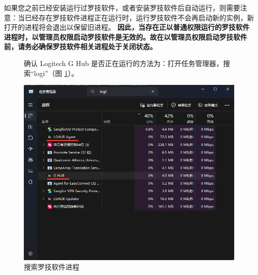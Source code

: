 如果您之前已经安装运行过罗技软件，或者安装罗技软件后自动运行，则需要注意：当已经存在罗技软件进程正在运行时，运行罗技软件不会再启动新的实例，新打开的进程将会退出以保留旧进程。
\textbf{\color{red}因此，当存在正以普通权限运行的罗技软件进程时，以管理员权限启动罗技软件是无效的。故在以管理员权限启动罗技软件前，请务必确保罗技软件相关进程处于关闭状态。}

\begin{figure}[H]
    \Centering
    \parbox[l]{\textwidth}{确认 Logitech G Hub 是否正在运行的方法为：打开任务管理器，搜索“logi”（图 \ref{ch0fig-search-lghub-process}）。}
    \includegraphics[width=\textwidth]{docs/assets/intro/search_lghub_process.png}
    \caption{搜索罗技软件进程}
    \label{ch0fig-search-lghub-process}
\end{figure}

